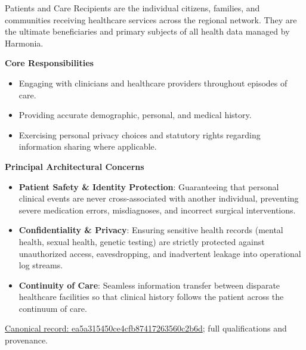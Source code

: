 Patients and Care Recipients are the individual citizens, families, and communities receiving healthcare services across the regional network. They are the ultimate beneficiaries and primary subjects of all health data managed by Harmonia.



\par\medskip\textbf{Core Responsibilities}\par


\begin{itemize}


\item Engaging with clinicians and healthcare providers throughout episodes of care.

\item Providing accurate demographic, personal, and medical history.

\item Exercising personal privacy choices and statutory rights regarding information sharing where applicable.

\end{itemize}


\par\medskip\textbf{Principal Architectural Concerns}\par


\begin{itemize}


\item \textbf{Patient Safety \& Identity Protection}: Guaranteeing that personal clinical events are never cross-associated with another individual, preventing severe medication errors, misdiagnoses, and incorrect surgical interventions.

\item \textbf{Confidentiality \& Privacy}: Ensuring sensitive health records (mental health, sexual health, genetic testing) are strictly protected against unauthorized access, eavesdropping, and inadvertent leakage into operational log streams.

\item \textbf{Continuity of Care}: Seamless information transfer between disparate healthcare facilities so that clinical history follows the patient across the continuum of care.

\end{itemize}

{\footnotesize \href{../../../../../../../continuum/motivation/stakeholder/ea5a315450ce4cfb87417263560c2b6d.md}{Canonical record: ea5a315450ce4cfb87417263560c2b6d}; full qualifications and provenance.}\par
